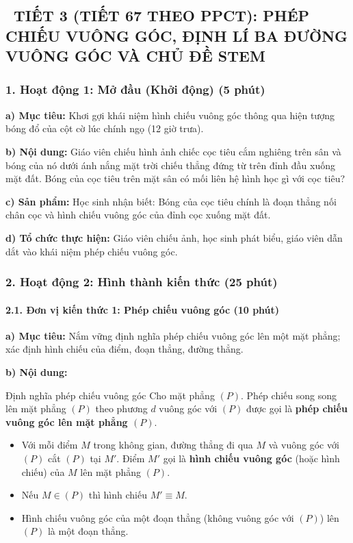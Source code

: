 \documentclass[12pt, a4paper]{article}
\begin{document}
\subsection*{\faClockO \ TIẾT 3 (TIẾT 67 THEO PPCT): PHÉP CHIẾU VUÔNG GÓC, ĐỊNH LÍ BA ĐƯỜNG VUÔNG GÓC VÀ CHỦ ĐỀ STEM}

\subsubsection*{1. Hoạt động 1: Mở đầu (Khởi động) (5 phút)}

\noindent \textbf{a) Mục tiêu:}
Khơi gợi khái niệm hình chiếu vuông góc thông qua hiện tượng bóng đổ của cột cờ lúc chính ngọ (12 giờ trưa).

\noindent \textbf{b) Nội dung:}
Giáo viên chiếu hình ảnh chiếc cọc tiêu cắm nghiêng trên sân và bóng của nó dưới ánh nắng mặt trời chiếu thẳng đứng từ trên đỉnh đầu xuống mặt đất. Bóng của cọc tiêu trên mặt sân có mối liên hệ hình học gì với cọc tiêu?

\noindent \textbf{c) Sản phẩm:}
Học sinh nhận biết: Bóng của cọc tiêu chính là đoạn thẳng nối chân cọc và hình chiếu vuông góc của đỉnh cọc xuống mặt đất.

\noindent \textbf{d) Tổ chức thực hiện:}
Giáo viên chiếu ảnh, học sinh phát biểu, giáo viên dẫn dắt vào khái niệm phép chiếu vuông góc.

\subsubsection*{2. Hoạt động 2: Hình thành kiến thức (25 phút)}

\paragraph{2.1. Đơn vị kiến thức 1: Phép chiếu vuông góc (10 phút)}

\noindent \textbf{a) Mục tiêu:}
Nắm vững định nghĩa phép chiếu vuông góc lên một mặt phẳng; xác định hình chiếu của điểm, đoạn thẳng, đường thẳng.

\noindent \textbf{b) Nội dung:}
\begin{pedabox}{Định nghĩa phép chiếu vuông góc}
Cho mặt phẳng $(P)$. Phép chiếu song song lên mặt phẳng $(P)$ theo phương $d$ vuông góc với $(P)$ được gọi là \textbf{phép chiếu vuông góc lên mặt phẳng $(P)$}.
\begin{itemize}[leftmargin=0.6cm]
    \item Với mỗi điểm $M$ trong không gian, đường thẳng đi qua $M$ và vuông góc với $(P)$ cắt $(P)$ tại $M'$. Điểm $M'$ gọi là \textbf{hình chiếu vuông góc} (hoặc hình chiếu) của $M$ lên mặt phẳng $(P)$.
    \item Nếu $M \in (P)$ thì hình chiếu $M' \equiv M$.
    \item Hình chiếu vuông góc của một đoạn thẳng (không vuông góc với $(P)$) lên $(P)$ là một đoạn thẳng.
\end{itemize}
\end{pedabox}
\end{document}
